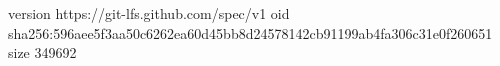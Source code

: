 version https://git-lfs.github.com/spec/v1
oid sha256:596aee5f3aa50c6262ea60d45bb8d24578142cb91199ab4fa306c31e0f260651
size 349692
